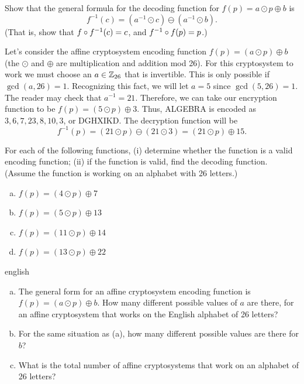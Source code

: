 \begin{exercise}{}
 Show that the  general formula for the decoding function for $f(p) = a \odot p \oplus b$ is
$$
f^{-1}(c) = (a^{-1} \odot c)  \ominus (a^{-1}\odot b).
$$
 (That is, show that $f \circ f^{-1}(c)=c$, and $ f^{-1}\circ  f(p) =  p$.)
\end{exercise}

\begin{example}{}
Let's consider the affine cryptosystem encoding function $f(p) = (a \odot p) \oplus  b$ (the $\odot$ and $\oplus$ are multiplication and addition mod 26).  For
this cryptosystem to work we must choose an $a \in {\Bbb Z}_{26}$
that is invertible. This is only possible if $\gcd(a, 26) = 1$.
Recognizing this fact, we will let $a = 5$ since $\gcd(5, 26) = 1$. The reader may check that $a^{-1} = 21$. Therefore, we can take our
encryption function to be $f(p) = (5 \odot p) \oplus 3$. Thus, ALGEBRA is
encoded as $3, 6, 7, 23, 8, 10, 3$, or DGHXIKD. The decryption
function will be   
$$
f^{-1}(p) = (21 \odot  p) \ominus (21\odot 3)  =(21 \odot  p) \oplus 15.
$$
\end{example}

\begin{exercise}{}
For each of the following functions, (i) determine whether the function is a valid encoding function; (ii) if the function is valid, find the decoding function. (Assume the function is working on an alphabet with 26 letters.)
\begin{enumerate}[(a)]
\item
$f(p) = (4 \odot p) \oplus 7$
\item
$f(p) = (5 \odot p) \oplus 13$
\item
$f(p) = (11 \odot p) \oplus 14$
\item
$f(p) = (13 \odot p) \oplus 22$
\end{enumerate}
\end{exercise}


\begin{exercise}{english}
\begin{enumerate}[(a)]
\item
The general form for an affine cryptosystem encoding function is $f(p) = (a \odot p) \oplus  b$. How many different possible values of $a$ are there, for an affine cryptosystem that works on the English alphabet of 26 letters?
\item
For the same situation as (a), how many different possible values are there for $b$?
\item
What is the total number of affine cryptosystems that work on an alphabet of 26 letters?
\end{enumerate}
\end{exercise}

